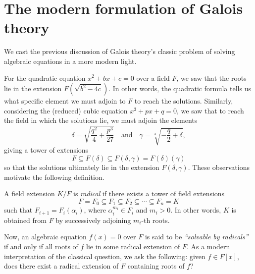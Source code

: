 \section{The modern formulation of Galois theory}

We cast the previous discussion of Galois theory's classic problem of solving algebraic equations in a more modern light.

For the quadratic equation $x^2 + bx + c = 0$ over a field $F$, we saw that the roots lie in the extension $F(\sqrt{b^2 - 4c})$. In other words, the quadratic formula tells us what specific element we must adjoin to $F$ to reach the solutions. Similarly, considering the (reduced) cubic equation $x^3 + px + q = 0$, we saw that to reach the field in which the solutions lie, we must adjoin the elements
\[
    \delta = \sqrt{\frac{q^2}{4} + \frac{p^3}{27}}
    \quad \text{and} \quad
    \gamma = \sqrt[3]{-\frac{q}{2} + \delta},
\]
giving a tower of extensions
\[
    F \subseteq F(\delta) \subseteq F(\delta, \gamma) = F(\delta)(\gamma)
\]
so that the solutions ultimately lie in the extension $F(\delta, \gamma)$. These observations motivate the following definition.

\begin{definition}
    A field extension $K/F$ is \emph{radical} if there exists a tower of field extensions
    \[
        F = F_0 \subseteq F_1 \subseteq F_2 \subseteq \cdots \subseteq F_n = K
    \]
    such that $F_{i + 1} = F_i(\alpha_i)$, where $\alpha_i^{m_i} \in F_i$ and $m_i > 0$. In other words, $K$ is obtained from $F$ by successively adjoining $m_i$-th roots.
\end{definition}

Now, an algebraic equation $f(x) = 0$ over $F$ is said to be \emph{``solvable by radicals''} if and only if all roots of $f$ lie in some radical extension of $F$. As a modern interpretation of the classical question, we ask the following: given $f \in F[x]$, does there exist a radical extension of $F$ containing roots of $f$?
